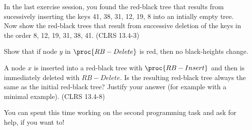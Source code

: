 \documentclass{article}
\begin{document}
\thispagestyle{fancy}

\begin{Exercise}[title={Simple training exercises}]

    \Question
    In the last exercise session, you found the red-black tree that results from
    sucessively inserting the keys 41, 38, 31, 12, 19, 8 into an intially empty
    tree. Now show the red-black trees that result from successive deletion of
    the keys in the order 8, 12, 19, 31, 38, 41. (CLRS 13.4-3)
    
    \Question
    Show that if node $y$ in $\proc{RB-Delete}$ is red, then no black-heights
    change.
    
    \Question
    A node $x$ is inserted into a red-black tree with $\proc{RB-Insert}$ and
    then is immediately deleted with $RB-Delete$. Is the resulting red-black
    tree always the same as the initial red-black tree? Justify your answer (for
    example with a minimal example). (CLRS 13.4-8)
    
\end{Exercise}

\begin{Exercise}[title={Programming Task 2}]
    \noindent
    You can spent this time working on the second programming task and ask for
    help, if you want to!

\end{Exercise}
\end{document}
